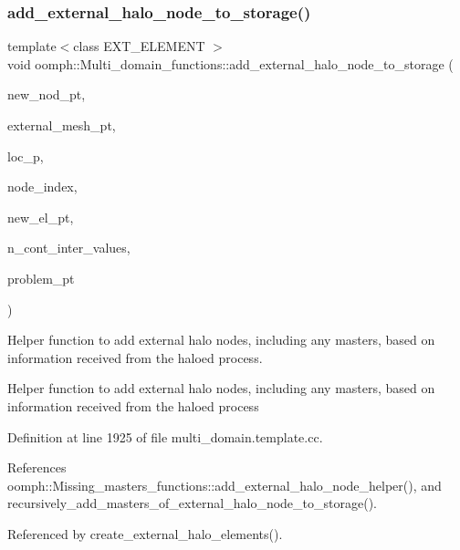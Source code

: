 \subsubsection{\texorpdfstring{add\+\_\+external\+\_\+halo\+\_\+node\+\_\+to\+\_\+storage()}{add\_external\_halo\_node\_to\_storage()}}
{\footnotesize\ttfamily template$<$class E\+X\+T\+\_\+\+E\+L\+E\+M\+E\+NT $>$ \\
void oomph\+::\+Multi\+\_\+domain\+\_\+functions\+::add\+\_\+external\+\_\+halo\+\_\+node\+\_\+to\+\_\+storage (\begin{DoxyParamCaption}\item[{\hyperlink{classoomph_1_1Node}{Node} $\ast$\&}]{new\+\_\+nod\+\_\+pt,  }\item[{\hyperlink{classoomph_1_1Mesh}{Mesh} $\ast$const \&}]{external\+\_\+mesh\+\_\+pt,  }\item[{unsigned \&}]{loc\+\_\+p,  }\item[{unsigned \&}]{node\+\_\+index,  }\item[{\hyperlink{classoomph_1_1FiniteElement}{Finite\+Element} $\ast$const \&}]{new\+\_\+el\+\_\+pt,  }\item[{int \&}]{n\+\_\+cont\+\_\+inter\+\_\+values,  }\item[{\hyperlink{classoomph_1_1Problem}{Problem} $\ast$}]{problem\+\_\+pt }\end{DoxyParamCaption})}



Helper function to add external halo nodes, including any masters, based on information received from the haloed process. 

Helper function to add external halo nodes, including any masters, based on information received from the haloed process 

Definition at line 1925 of file multi\+\_\+domain.\+template.\+cc.



References oomph\+::\+Missing\+\_\+masters\+\_\+functions\+::add\+\_\+external\+\_\+halo\+\_\+node\+\_\+helper(), and recursively\+\_\+add\+\_\+masters\+\_\+of\+\_\+external\+\_\+halo\+\_\+node\+\_\+to\+\_\+storage().



Referenced by create\+\_\+external\+\_\+halo\+\_\+elements().

\mbox{\label{namespaceoomph_1_1Multi__domain__functions_a7116b75de2083297cc1ab4e4b1ca2e48}} 
